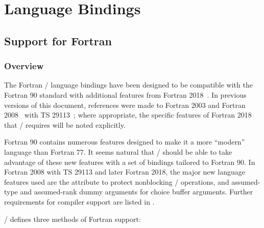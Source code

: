 \chapter{Language Bindings}
\label{sec:binding-2}
\label{chap:binding-2}

\section{Support for Fortran}
\label{sec:fortran}

\subsection{Overview}
\label{f90:overview}

The Fortran \MPI/ language bindings have been designed to be
compatible with the Fortran 90 standard
with additional features from Fortran 2018~\cite{fortran2018}.
In previous versions of this document, references were made to
Fortran 2003 and Fortran 2008~\cite{fortran2008} with
TS 29113~\cite{fortran2008:ts29113-interop};
where appropriate, the specific features of Fortran 2018 that
\MPI/ requires will be noted explicitly.

\begin{rationale} Fortran 90 contains numerous features designed to
make it a more ``modern'' language than Fortran 77. It seems natural
that \MPI/ should be able to take advantage of these new features with
a set of bindings tailored to Fortran 90.
In Fortran 2008 with TS 29113 and later Fortran 2018,
the major new language features
used are the  attribute to protect nonblocking \MPI/ operations,
and assumed-type and assumed-rank dummy arguments for choice buffer arguments.
Further requirements for compiler support are listed in
.
\end{rationale}

\MPI/ defines three methods of Fortran support:

